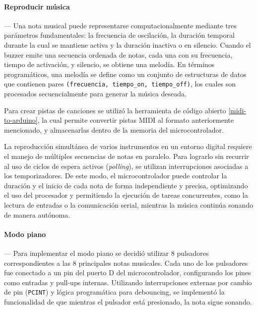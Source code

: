     \vspace{1em}

    \paragraph*{\textbf{Reproducir música}}---
    Una nota musical puede representarse computacionalmente mediante tres parámetros fundamentales: la frecuencia de oscilación, la duración temporal durante la cual se mantiene activa y la duración inactiva o en silencio. Cuando el buzzer emite una secuencia ordenada de notas, cada una con su frecuencia, tiempo de activación, y silencio, se obtiene una melodía. En términos programáticos, una melodía se define como un conjunto de estructuras de datos que contienen pares \texttt{(frecuencia, tiempo\_on, tiempo\_off)}, los cuales son procesados secuencialmente para generar la música deseada.
    
    Para crear pistas de canciones se utilizó la herramienta de código abierto \ref{midi-to-arduino}, la cual permite convertir pistas MIDI al formato anteriormente mencionado, y almacenarlas dentro de la memoria del microcontrolador.

    \vspace{1em}

    La reproducción simultánea de varios instrumentos en un entorno digital requiere el manejo de múltiples secuencias de notas en paralelo. Para lograrlo sin recurrir al uso de ciclos de espera activos (\textit{polling}), se utilizan interrupciones asociadas a los temporizadores. De este modo, el microcontrolador puede controlar la duración y el inicio de cada nota de forma independiente y precisa, optimizando el uso del procesador y permitiendo la ejecución de tareas concurrentes, como la lectura de entradas o la comunicación serial, mientras la música continúa sonando de manera autónoma.

    \vspace{1em}

    \paragraph*{\textbf{Modo piano}}---
    Para implementar el modo piano se decidió utilizar 8 pulsadores correspondientes a las 8 principales notas musicales. Cada uno de los pulsadores fue conectado a un pin del puerto D del microcontrolador, configurando los pines como entradas y pull-ups internas. Utilizando interrupciones externas por cambio de pin (\texttt{PCINT}) y lógica programática para debouncing, se implementó la funcionalidad de que mientras el pulsador está presionado, la nota sigue sonando.

